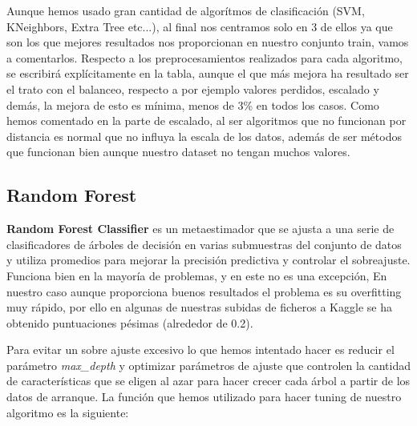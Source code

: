 \documentclass[12pt,twoside]{report}
\begin{document}
Aunque hemos usado gran cantidad de algorítmos de clasificación (SVM, KNeighbors, Extra Tree etc...), al final nos centramos solo en 3 de ellos ya que son los que mejores resultados nos proporcionan en nuestro conjunto train, vamos a comentarlos. Respecto a los preprocesamientos realizados para cada algoritmo, se escribirá explícitamente en la tabla, aunque el que más mejora ha resultado ser el trato con el balanceo, respecto a por ejemplo valores perdidos, escalado y demás, la mejora de esto es mínima, menos de 3\% en todos los casos. Como hemos comentado en la parte de escalado, al ser algoritmos que no funcionan por distancia es normal que no influya la escala de los datos, además de ser métodos que funcionan bien aunque nuestro dataset no tengan muchos valores.

\subsection*{Random Forest}

\textbf{Random Forest Classifier}\cite{rfc} es un metaestimador que se ajusta a una serie de clasificadores de árboles de decisión en varias submuestras del conjunto de datos y utiliza promedios para mejorar la precisión predictiva y controlar el sobreajuste. Funciona bien en la mayoría de problemas, y en este no es una excepción, En nuestro caso aunque proporciona buenos resultados el problema es su overfitting muy rápido, por ello en algunas de nuestras subidas de ficheros a Kaggle se ha obtenido puntuaciones pésimas (alrededor de 0.2).

Para evitar un sobre ajuste excesivo lo que hemos intentado hacer es reducir el parámetro \textit{max\_depth} y optimizar parámetros de ajuste que controlen la cantidad de características que se eligen al azar para hacer crecer cada árbol a partir de los datos de arranque. La función que hemos utilizado para hacer tuning de nuestro algoritmo es la siguiente:\\
\\
\end{document}
